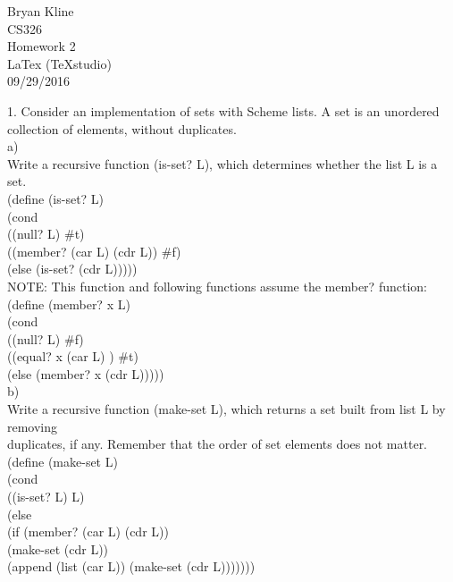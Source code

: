 \documentclass[12pt]{article}
\begin{document}
\begin{center}

\Huge
Bryan Kline\\
[10mm]
CS326\\ 
[10mm]
Homework 2\\
\small LaTex (TeXstudio)\\
[10mm]
\Huge
09/29/2016\\
[200mm]

\end{center}

\begin{flushleft}
1. Consider an implementation of sets with Scheme lists.  A set is an unordered collection of elements, without duplicates. \\
[2mm]

\qquad a)\\
\qquad \qquad Write a recursive function (is-set? L), which determines whether the list L is a set.\\
[2mm]

\qquad \qquad \qquad
(define (is-set? L)\\
\qquad \qquad \qquad \qquad
(cond\\
\qquad \qquad \qquad \qquad \qquad
((null? L) \#t)\\
\qquad \qquad \qquad \qquad \qquad
((member? (car L) (cdr L)) \#f)\\
\qquad \qquad \qquad \qquad \qquad
(else (is-set? (cdr L)))))\\
[2mm]
\qquad \qquad \qquad NOTE: This function and following functions assume the member? function:\\
[2mm]
\qquad \qquad \qquad (define (member? x L)\\
\qquad \qquad \qquad \qquad (cond\\
\qquad \qquad \qquad \qquad \qquad ((null? L) \#f)\\
\qquad \qquad \qquad \qquad \qquad ((equal? x (car L) ) \#t)\\
\qquad \qquad \qquad \qquad \qquad (else (member? x (cdr L)))))\\

\qquad b)\\
\qquad \qquad Write a recursive function (make-set L), which returns a set built from list L by removing\\
\qquad \qquad duplicates, if any. Remember that the order of set elements does not matter.\\
[2mm]

\qquad \qquad \qquad (define (make-set L)\\
\qquad \qquad \qquad \qquad (cond\\
\qquad \qquad \qquad \qquad \qquad ((is-set? L) L)\\
\qquad \qquad \qquad \qquad \qquad (else\\
\qquad \qquad \qquad \qquad \qquad (if (member? (car L) (cdr L))\\
\qquad \qquad \qquad \qquad \qquad (make-set (cdr L))\\
\qquad \qquad \qquad \qquad \qquad (append (list (car L)) (make-set (cdr L)))))))\\


\end{flushleft}
\end{document}
